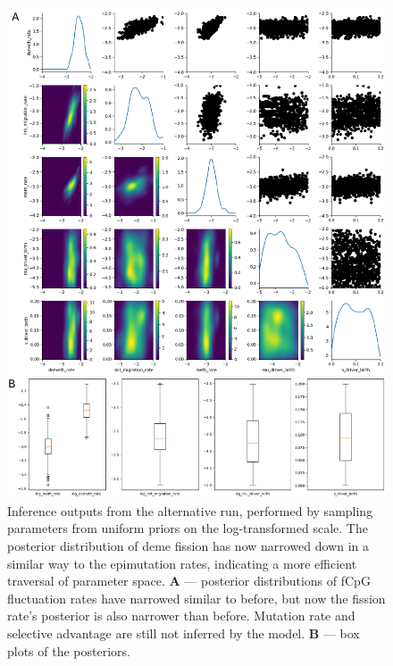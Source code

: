 \begin{figure}[h]
    \centering
    \includegraphics[width=\textwidth]{Chapter_5/figures/inference_raw/inference_S.pdf}
    \caption{Inference outputs from the alternative run, performed by sampling
    parameters from uniform priors on the log-transformed scale. The posterior
    distribution of deme fission has now narrowed down in a similar way to the
    epimutation rates, indicating a more efficient traversal of parameter space.
    \textbf{A} --- posterior distributions of fCpG fluctuation rates have
    narrowed similar to before, but now the fission rate's posterior is also
    narrower than before. Mutation rate and selective advantage are still not
    inferred by the model.
    \textbf{B} --- box plots of the posteriors.}
    \label{fig:inference_2}
\end{figure}
\clearpage

